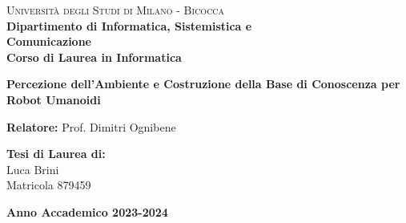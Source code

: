

\begin{titlepage}

    \noindent
    \begin{minipage}[t]{0.19\textwidth}
    \end{minipage}
    \hspace{2mm}
    \begin{minipage}[t]{0.70\textwidth}
        {
            {\textsc{Università degli Studi di Milano - Bicocca}} \\
            \textbf{Dipartimento di Informatica, Sistemistica e \\ Comunicazione} \\
            \textbf{Corso di Laurea in Informatica} \\
            \par
        }
    \end{minipage}

    \vspace{40mm}

    \begin{center}
        {\LARGE{
                \textbf{Percezione dell'Ambiente e Costruzione della Base di Conoscenza per Robot Umanoidi}
                \par
            }}
    \end{center}

    \vspace{50mm}

    \noindent
    {\large \textbf{Relatore:} Prof. Dimitri Ognibene } \\

    \vspace{15mm}

    \begin{flushright}
        {\large \textbf{Tesi di Laurea di:}} \\
        \large{Luca Brini} \\
        \large{Matricola 879459}
    \end{flushright}

    \vspace{20mm}
    \begin{center}
        {\large{\bf Anno Accademico 2023-2024}}
    \end{center}


\end{titlepage}
